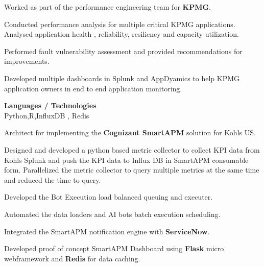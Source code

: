 \documentclass[a4,10pt]{cv4tw}
\begin{document}
                    {
                        \begin{missions}
                        \item Worked as part of the performance engineering team for \textbf{KPMG}.
                        \item Conducted performance analysis for multiple critical KPMG applications. Analysed  application health , reliability, resiliency and capacity utilization.
                        \item Performed fault vulnerability assessment and provided recommendations for improvements.
                        \item Developed multiple dashboards in Splunk and AppDyamics to help KPMG application owners in end to end application monitoring.
                        \end{missions}
                        }

                        {\textbf{Languages / Technologies} \\Python,R,InfluxDB , Redis}
                        {
                            \begin{missions}
                            \item Architect for implementing the \textbf{Cognizant SmartAPM} solution for Kohls US.
                            \item Designed and developed a python based metric collector to collect KPI data from Kohls Splunk and push the KPI data to Influx DB in SmartAPM consumable form. Parallelized the metric collector to query multiple metrics at the same time and reduced the time to query.
                            \item Developed the Bot Execution load balanced queuing  and executer.
                            \item Automated the data loaders and AI bots batch execution scheduling.
                            \item Integrated the SmartAPM notification engine with \textbf{ServiceNow}.
                            \item Developed proof of concept SmartAPM Dashboard using \textbf{Flask} micro webframework and  \textbf{Redis} for data caching.
                            \end{missions}
                            }
\end{document}
